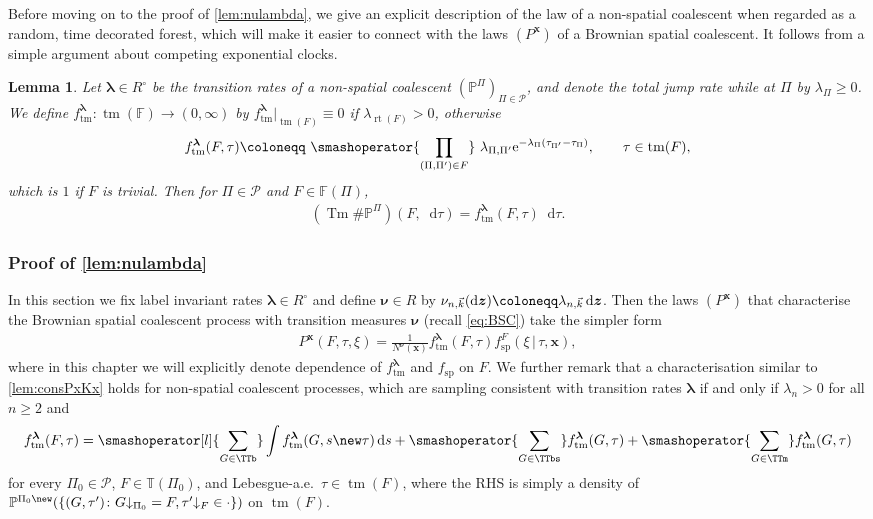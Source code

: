 \documentclass[reqno,draft]{amsart}
\numberwithin{equation}{section}
\theoremstyle{plain}
\newtheorem{lemma}[theorem]{Lemma}
\theoremstyle{remark}
\renewcommand{\P}{\mathbb{P}} %
\newcommand*\diff{\mathop{}\!\mathrm{d}}
\newcommand{\e}{\mathrm{e}}
\newcommand{\fpart}{\Pi} %
\newcommand{\rates}{R^\circ} %
\newcommand{\nurates}{R} %
\DeclareMathOperator{\rt}{rt}
\DeclareMathOperator{\dct}{tm}
\DeclareMathOperator{\tm}{Tm}
\newcommand{\smashop}[1]{\,\,\smashoperator{#1}\,\,}
\newcommand{\ftm}{f_\mathrm{tm}^{\boldsymbol \lambda}}
\newcommand{\fsp}{f_\mathrm{sp}}
\newcommand{\nunk}{\nu_{n,\smash{\vec{k}}}}
\newcommand{\rsto}[1]{\mathord\downarrow_{#1}}
\begin{document}
Before moving on to the proof of \cref{lem:nulambda}, we give an explicit description of the law of a non-spatial coalescent when regarded as a random, time decorated forest, which will make it easier to connect with the laws $(P^{\boldsymbol x})$ of a Brownian spatial coalescent. It follows from a simple argument about competing exponential clocks.
\begin{lemma}\label{lem:ftm}
    Let $\boldsymbol \lambda \in \rates$ be the transition rates of a non-spatial coalescent $(\P^{\fpart})_{\fpart\in \mathcal{P}}$, and denote the total jump rate while at $\fpart$ by $\lambda_\fpart\ge 0$. We define $\ftm\colon \dct(\mathbb{F}) \to (0,\infty)$ by $\ftm\big\vert_{\dct(F)}\equiv 0$ if $\lambda_{\rt(F)} > 0$, otherwise
    \begin{equation*}%
        \ftm(F,\tau) \coloneqq \smashop{\prod_{(\fpart,\fpart') \in F}} \lambda_{\fpart,\fpart'} \e^{-\lambda_\fpart(\tau_{\fpart'}-\tau_\fpart)},\qquad \tau \in \dct(F),
    \end{equation*}
    which is $1$ if $F$ is trivial. Then for $\fpart\in \mathcal{P}$ and $F\in \mathbb{F}(\fpart)$,
    \begin{align*}
        (\tm\#\P^{\fpart})(F,\diff \tau) = \ftm(F,\tau)\diff \tau.
    \end{align*}
\end{lemma}

\subsubsection{Proof of \cref{lem:nulambda}}\label{sec:lemnulambda}

In this section we fix label invariant rates $\boldsymbol \lambda\in \rates$ and define $\boldsymbol \nu \in \nurates$ by $\nunk(\diff \boldsymbol z) \coloneqq \lambda_{n,\smash{\vec{k}}} \diff \boldsymbol z$. Then the laws $(P^{\boldsymbol x})$ that characterise the Brownian spatial coalescent process with transition measures $\boldsymbol \nu$ (recall \cref{eq:BSC}) take the simpler form
\begin{align}\label{eq:Pxlambda}
    P^{\boldsymbol x}(F,\tau,\xi) = \frac{1}{N^{\boldsymbol\nu}(\boldsymbol x)} \ftm(F,\tau) \fsp^F(\xi \,\vert\,\tau,\boldsymbol x),
\end{align}
where in this chapter we will explicitly denote dependence of $\ftm$ and $\fsp$ on $F$. We further remark that a characterisation similar to \cref{lem:consPxKx} holds for non-spatial coalescent processes, which are sampling consistent with transition rates $\boldsymbol \lambda$ if and only if $\lambda_n > 0$ for all $n\ge 2$ and
\begin{equation}\label{eq:consftm}
    \ftm(F,\tau) = \smashoperator[l]{\sum_{G\in \TTb}} \int \ftm(G,s\new\tau) \diff s + \smashoperator{\sum_{G\in \TTbs}} \ftm(G,\tau) + \smashoperator{\sum_{G\in \TTm}} \ftm(G,\tau)
\end{equation}
for every $\fpart_0\in \mathcal{P}$, $F\in \mathbb{T}(\fpart_0)$, and Lebesgue-a.e.\ $\tau \in \dct(F)$, where the RHS is simply a density of $\P^{\fpart_0\new}(\{(G,\tau')\colon G\rsto{\fpart_0} = F, \tau'\rsto{F} \in \cdot \}) $ on $\dct(F)$.
\end{document}
